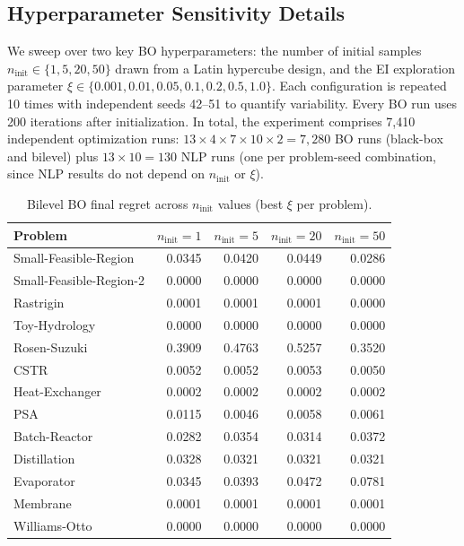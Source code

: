 \documentclass[12pt,a4paper]{article}%
\theoremstyle{plain}%
\theoremstyle{remark}%
\theoremstyle{definition}%
\begin{document}
\begin{appendices}
\section{Hyperparameter Sensitivity Details}\label{sec:hyperparameter_details}

We sweep over two key BO hyperparameters: the number of initial samples $n_\text{init} \in \{1, 5, 20, 50\}$ drawn from a Latin hypercube design, and the EI exploration parameter $\xi \in \{0.001, 0.01, 0.05, 0.1, 0.2, 0.5, 1.0\}$. Each configuration is repeated 10 times with independent seeds 42--51 to quantify variability. Every BO run uses 200 iterations after initialization. In total, the experiment comprises 7{,}410 independent optimization runs: $13 \times 4 \times 7 \times 10 \times 2 = 7{,}280$ BO runs (black-box and bilevel) plus $13 \times 10 = 130$ NLP runs (one per problem-seed combination, since NLP results do not depend on $n_\text{init}$ or $\xi$).

\begin{table}[htbp]
\centering
\caption{Bilevel BO final regret across $n_\text{init}$ values (best $\xi$ per problem).}
\label{tab:ninit_sensitivity}
\begin{tabular}{@{}lrrrr@{}}
\toprule
\textbf{Problem} & $n_\text{init}=1$ & $n_\text{init}=5$ & $n_\text{init}=20$ & $n_\text{init}=50$ \\
\midrule
Small-Feasible-Region   & 0.0345 & 0.0420 & 0.0449 & 0.0286 \\
Small-Feasible-Region-2 & 0.0000 & 0.0000 & 0.0000 & 0.0000 \\
Rastrigin               & 0.0001 & 0.0001 & 0.0001 & 0.0000 \\
Toy-Hydrology           & 0.0000 & 0.0000 & 0.0000 & 0.0000 \\
Rosen-Suzuki            & 0.3909 & 0.4763 & 0.5257 & 0.3520 \\
CSTR                    & 0.0052 & 0.0052 & 0.0053 & 0.0050 \\
Heat-Exchanger          & 0.0002 & 0.0002 & 0.0002 & 0.0002 \\
PSA                     & 0.0115 & 0.0046 & 0.0058 & 0.0061 \\
Batch-Reactor           & 0.0282 & 0.0354 & 0.0314 & 0.0372 \\
Distillation            & 0.0328 & 0.0321 & 0.0321 & 0.0321 \\
Evaporator              & 0.0345 & 0.0393 & 0.0472 & 0.0781 \\
Membrane                & 0.0001 & 0.0001 & 0.0001 & 0.0001 \\
Williams-Otto           & 0.0000 & 0.0000 & 0.0000 & 0.0000 \\
\bottomrule
\end{tabular}
\end{table}


\end{appendices}
\end{document}
